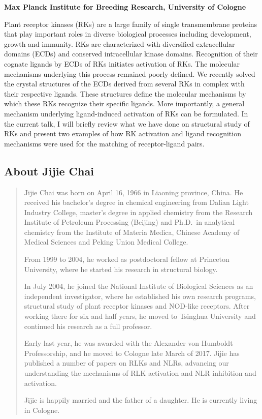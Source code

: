 \documentclass[12pt,]{book}
\begin{document}
\textbf{Max Planck Institute for Breeding Research, University of
Cologne}

Plant receptor kinases (RKs) are a large family of single transmembrane
proteins that play important roles in diverse biological processes
including development, growth and immunity. RKs are characterized with
diversified extracellular domains (ECDs) and conserved intracellular
kinase domains. Recognition of their cognate ligands by ECDs of RKs
initiates activation of RKs. The molecular mechanisms underlying this
process remained poorly defined. We recently solved the crystal
structures of the ECDs derived from several RKs in complex with their
respective ligands. These structures define the molecular mechanisms by
which these RKs recognize their specific ligands. More importantly, a
general mechanism underlying ligand-induced activation of RKs can be
formulated. In the current talk, I will briefly review what we have done
on structural study of RKs and present two examples of how RK activation
and ligand recognition mechanisms were used for the matching of
receptor-ligand pairs.

\subsection*{About Jijie Chai}\label{about-jijie-chai}

\begin{quote}
Jijie Chai was born on April 16, 1966 in Liaoning province, China. He
received his bachelor's degree in chemical engineering from Dalian Light
Industry College, master's degree in applied chemistry from the Research
Institute of Petroleum Processing (Beijing) and Ph.D.~in analytical
chemistry from the Institute of Materia Medica, Chinese Academy of
Medical Sciences and Peking Union Medical College.

From 1999 to 2004, he worked as postdoctoral fellow at Princeton
University, where he started his research in structural biology.

In July 2004, he joined the National Institute of Biological Sciences as
an independent investigator, where he established his own research
programs, structural study of plant receptor kinases and NOD-like
receptors. After working there for six and half years, he moved to
Tsinghua University and continued his research as a full professor.

Early last year, he was awarded with the Alexander von Humboldt
Professorship, and he moved to Cologne late March of 2017. Jijie has
published a number of papers on RLKs and NLRs, advancing our
understanding the mechanisms of RLK activation and NLR inhibition and
activation.

Jijie is happily married and the father of a daughter. He is currently
living in Cologne.
\end{quote}
\end{document}
